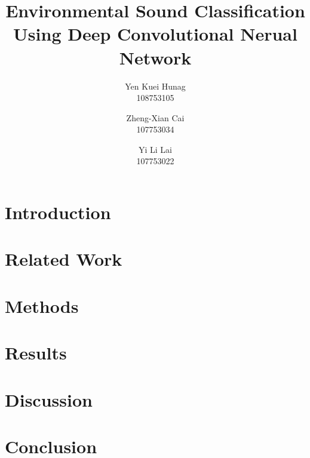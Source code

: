 \documentclass[11pt,oneside,a4paper]{article}
\title{ \LARGE \bf
Environmental Sound Classification Using Deep Convolutional Nerual Network
}
\author{Yen Kuei Hunag \\ 108753105 \and  Zheng-Xian Cai \\ 107753034 \and Yi Li Lai \\ 107753022}
\date{\vspace{-5ex}}
\begin{document}
\maketitle

\begin{abstract}
    
\end{abstract}
\section{Introduction}
    
\section{Related Work}
    
\section{Methods}
    
\section{Results}
    
\section{Discussion}
    
\section{Conclusion}
    
{}

\nocite{*}
\end{document}
